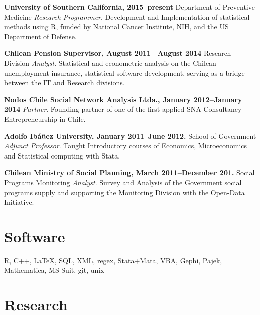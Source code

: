 \documentclass[letterpaper, 11pt]{article}
\renewenvironment{itemize}{
  \begin{list}{}{
    \setlength{\leftmargin}{0.45cm}
  }
}{
  \end{list}
}
\begin{document}
\begin{itemize}
\item \textbf{University of Southern California, 2015--present} Department of Preventive Medicine \emph{Research Programmer}. Development and Implementation of statistical methods using R, funded by National Cancer Institute, NIH, and the US Department of Defense.
\item \textbf{Chilean Pension Supervisor, August 2011-- August 2014} Research Division \emph{Analyst}. Statistical and econometric analysis on the Chilean unemployment insurance, statistical software development, serving as a bridge between the IT and Research divisions.
\item \textbf{Nodos Chile Social Network Analysis Ltda., January 2012--January 2014} \emph{Partner}.
Founding partner of one of the first applied SNA Consultancy Entrepreneurship in Chile.
\item \textbf{Adolfo Ib\'a\~nez University, January 2011--June 2012.} School of Government \emph{Adjunct Professor}.
Taught Introductory courses of Economics, Microeconomics and Statistical computing with Stata.
\item \textbf{Chilean Ministry of Social Planning, March 2011--December 201.} Social Programs Monitoring \emph{Analyst}.
Survey and Analysis of the Government social programs supply and supporting the Monitoring Division with the Open-Data Initiative.
\end{itemize}

\section*{Software}

\begin{itemize}
\item[] R, C++, \LaTeX, SQL, XML, regex, Stata+Mata, VBA, Gephi, Pajek, Mathematica, MS Suit, git, unix
\end{itemize}

\section*{Research}
\end{document}
